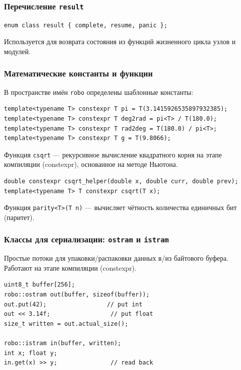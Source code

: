 \documentclass[a4paper,12pt]{article}
\begin{document}
\subsubsection{Перечисление \texttt{result}}

\begin{lstlisting}
enum class result { complete, resume, panic };
\end{lstlisting}
Используется для возврата состояния из функций жизненного цикла узлов и модулей.

\subsubsection{Математические константы и функции}

В пространстве имён \texttt{robo} определены шаблонные константы:
\begin{lstlisting}
template<typename T> constexpr T pi = T(3.1415926535897932385);
template<typename T> constexpr T deg2rad = pi<T> / T(180.0);
template<typename T> constexpr T rad2deg = T(180.0) / pi<T>;
template<typename T> constexpr T g = T(9.8066);
\end{lstlisting}

Функция \texttt{csqrt} — рекурсивное вычисление квадратного корня на этапе компиляции (constexpr), основанное на методе Ньютона.
\begin{lstlisting}
double constexpr csqrt_helper(double x, double curr, double prev);
template<typename T> T constexpr csqrt(T x);
\end{lstlisting}

Функция \texttt{parity<T>(T n)} — вычисляет чётность количества единичных бит (паритет).

\subsubsection{Классы для сериализации: \texttt{ostram} и \texttt{istram}}

Простые потоки для упаковки/распаковки данных в/из байтового буфера. Работают на этапе компиляции (constexpr).

\begin{lstlisting}[caption={ostram usage example}]
uint8_t buffer[256];
robo::ostram out(buffer, sizeof(buffer));
out.put(42);                 // put int
out << 3.14f;                 // put float
size_t written = out.actual_size();

robo::istram in(buffer, written);
int x; float y;
in.get(x) >> y;               // read back
\end{lstlisting}
\end{document}
